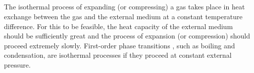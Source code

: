 \subsection{}\label{9.5.9} The isothermal process  of expanding (or compressing) a gas takes place in heat exchange  between the gas and the external me­dium at a constant tempera­ture difference. For this to be feasible, the heat capacity  of the external medium should be sufficiently great and the process of expansion (or compression) should proceed extremely slowly. First-order phase transitions , such as boiling and condensa­tion, are isothermal processes if they proceed at constant ex­ternal pressure.

